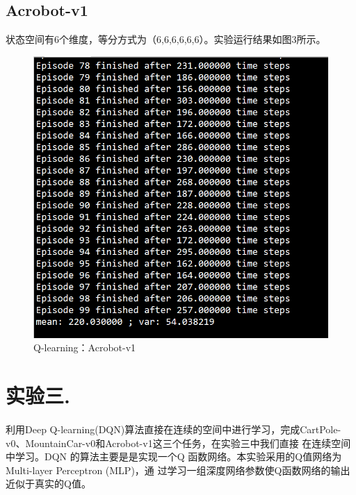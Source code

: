 \documentclass[a4paper,UTF8]{article}
\theoremstyle{definition}
\begin{document}
\subsection{Acrobot-v1}
    状态空间有6个维度，等分方式为（6,6,6,6,6,6）。实验运行结果如图3所示。
    \begin{center}
    \begin{figure}[H]
          \centering
          \includegraphics[width=12cm]{3.png}
          \caption{Q-learning：Acrobot-v1}
          \label{fig:2.3}
    \end{figure}
    \end{center}
	
\section{实验三. }
    \paragraph*{}
	利用Deep Q-learning(DQN)算法直接在连续的空间中进行学习，完成CartPole-v0、MountainCar-v0和Acrobot-v1这三个任务，在实验三中我们直接
    在连续空间中学习。DQN 的算法主要是是实现一个Q 函数网络。本实验采用的Q值网络为Multi-layer Perceptron (MLP)，通
    过学习一组深度网络参数使Q函数网络的输出近似于真实的Q值。
    
\end{document}
